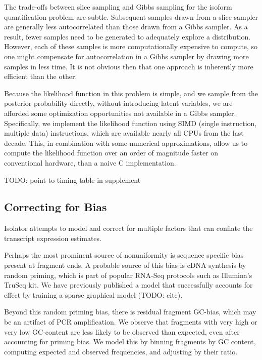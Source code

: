 \documentclass[twocolumn]{article}
\begin{document}
The trade-offs between slice sampling and Gibbs sampling for the isoform
quantification problem are subtle. Subsequent samples drawn from a slice
sampler are generally less autocorrelated than those drawn from a Gibbs
sampler. As a result, fewer samples need to be generated to adequately
explore a distribution. However, each of these samples is more
computationally expensive to compute, so one might compensate for
autocorrelation in a Gibbs sampler by drawing more samples in less time.
It is not obvious then that one approach is inherently more efficient
than the other.

Because the likelihood function in this problem is simple, and we sample
from the posterior probability directly, without introducing latent
variables, we are afforded some optimization opportunities not available
in a Gibbs sampler. Specifically, we implement the likelihood function
using SIMD (single instruction, multiple data) instructions, which are
available nearly all CPUs from the last decade. This, in combination
with some numerical approximations, allow us to compute the likelihood
function over an order of magnitude faster on conventional hardware,
than a naive C implementation.

TODO: point to timing table in supplement

\subsection{Correcting for Bias}\label{correcting-for-bias}

Isolator attempts to model and correct for multiple factors that can
conflate the transcript expression estimates.

Perhaps the most prominent source of nonuniformity is sequence specific
bias present at fragment ends. A probable source of this bias is cDNA
synthesis by random priming, which is part of popular RNA-Seq protocols
such as Illumina's TruSeq kit. We have previously published a model that
successfully accounts for effect by training a sparse graphical model
(TODO: cite).

Beyond this random priming bias, there is residual fragment GC-bias,
which may be an artifact of PCR amplification. We observe that fragments
with very high or very low GC-content are less likely to be observed
than expected, even after accounting for priming bias. We model this by
binning fragments by GC content, computing expected and observed
frequencies, and adjusting by their ratio.
\end{document}
